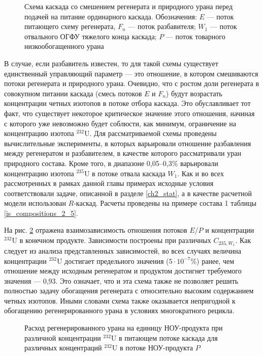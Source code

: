 \begin{figure}[ht]
  \caption{Схема каскада со смешением регенерата и природного урана перед подачей на питание ординарного каскада. Обозначения: $E$ --- поток питающего схему регенерата, $F_n$ --- поток разбавителя; $W_1$ --- поток отвального ОГФУ тяжелого конца каскада; $P$ --- поток товарного низкообогащенного урана}\label{o3}
\end{figure}

В случае, если разбавитель известен, то для такой схемы существует единственный управляющий параметр --- это отношение, в котором смешиваются потоки регенерата и природного урана. Очевидно, что с ростом доли регенерата в совокупном питании каскада (смесь потоков $E$ и $F_n$) будут возрастать концентрации четных изотопов в потоке отбора каскада. Это обуславливает тот факт, что существует некоторое критическое значение этого отношения, начиная с которого уже невозможно будет соблюсти, как минимум, ограничение на концентрацию изотопа $^{232}$U. Для рассматриваемой схемы проведены вычислительные эксперименты, в которых варьировали отношение разбавления между регенератом и разбавителем, в качестве которого рассматривали уран природного состава. Кроме того, в диапазоне 0,05--0,3\% варьировали концентрацию изотопа $^{235}$U в потоке отвала каскада $W_1$. Как и во всех рассмотренных в рамках данной главы примерах исходные условия соответствовали задаче, описанной в разделе \ref{ch2_stat}, а в качестве расчетной модели использован $R$-каскад. Расчеты проведены на примере состава 1 таблицы \ref{is_compositions_2_5}. 

На рис. \ref{sc3_1.second} отражена взаимозависимость отношения потоков $E/P$ и концентрации $^{232}$U в конечном продукте. Зависимости построены при различных $C_{235, W_1}$. Как следует из анализа представленных зависимостей, во всех случаях величина концентрации  $^{232}$U достигает предельного значения ($5\cdot10^{-7}$\%) ранее, чем отношение между исходным регенератом и продуктом достигнет требуемого значения --- 0,93. Это означает, что и эта схема также не позволяет решить полностью задачу обогащения регенерата с относительно высоким содержанием четных изотопов. Иными словами схема также оказывается непригодной к обогащению регенерированного урана в условиях многократного рецикла.

\begin{figure}[ht]
  \caption{Расход регенерированного урана на единицу НОУ-продукта при различной концентрации $^{232}$U в питающем потоке каскада для различных концентраций $^{232}$U в потоке НОУ-продукта $P$}\label{sc3_1.second}
\end{figure}

